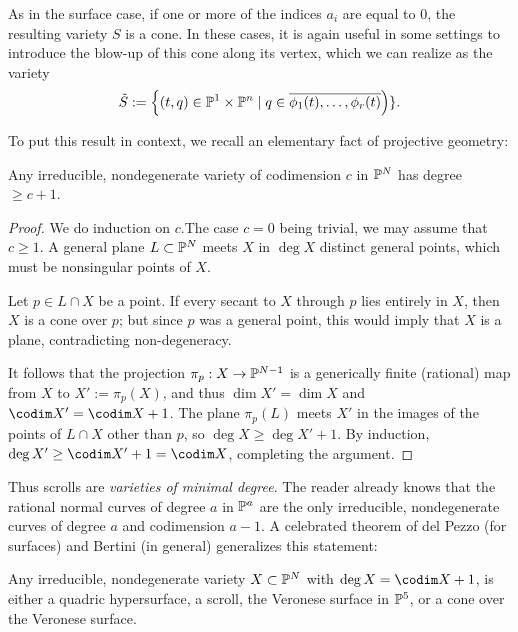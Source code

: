 As in the surface case, if one or more of the indices $a_i$ are equal to 0, the resulting variety $S$ is a cone. In these cases, it is again useful in some settings to introduce the blow-up of this cone along its vertex, which we can realize as the variety
$$
\tilde S := \left\{ (t, q) \in \PP^1 \times \PP^n  \mid q \in \overline{\phi_1(t), \dots, \phi_r(t)}\right)\}.
$$

To put this result in context, we recall an elementary fact of projective geometry:
 
\begin{proposition}\label{minimal degree}
 Any irreducible, nondegenerate variety of codimension $c$ in $\PP^{N}$ has degree $\geq c +1$.
\end{proposition}

\begin{proof} We do induction on $c$.The case $c=0$ being trivial,
 we may assume that $c\geq1$. A general plane $L\subset \PP^{N}$ meets $X$ in $\deg X$
 distinct general points, which must be nonsingular points of $X$.
 
Let $p\in L\cap X$ be a point. If every secant to $X$ through $p$ lies entirely in $X$, then $X$ is a cone over $p$; but since $p$ was a general point, this would imply that $X$ is a plane, contradicting non-degeneracy. 

It follows that the projection $\pi_{p}:X \to \PP^{N-1}$ is a generically finite (rational) map from $X$ to $X' := \pi_{p}(X)$,
and thus $\dim X' = \dim X$ and $\codim X' = \codim X+1$. The plane 
$\pi_{p}(L)$ meets $X'$ in the images of the points of $L\cap X$ other than $p$, so
$\deg X\geq \deg X'+1$. By induction, $\deg X' \geq \codim X'+1 = \codim X$, completing the argument.
\end{proof}

Thus scrolls are \emph{varieties of minimal degree}. The reader already knows that the rational normal curves of degree $a$ in $\PP^{a}$ are the only irreducible, nondegenerate curves of degree $a$ and codimension $a-1$. A celebrated theorem of del Pezzo (for surfaces) and Bertini (in general) generalizes this statement:

\begin{fact}\label{classification of scrolls} 
Any irreducible, nondegenerate variety $X\subset \PP^{N}$  with $\deg X = \codim X+1$, is either a quadric hypersurface, a scroll, the Veronese surface in $\PP^{5}$, or a cone over the Veronese surface.
\end{fact}


